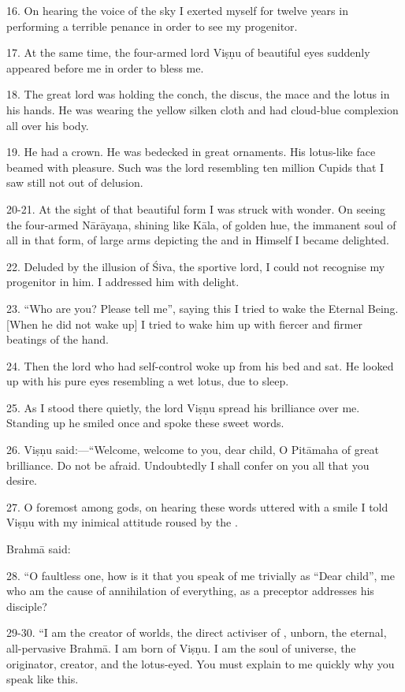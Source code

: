 16. On hearing the voice of the sky I exerted myself for twelve years in
performing a terrible penance in order to see my progenitor.

17. At the same time, the four-armed lord Viṣṇu of beautiful eyes suddenly
appeared before me in order to bless me.

18. The great lord was holding the conch, the discus, the mace and the lotus in
his hands. He was wearing the yellow silken cloth and had cloud-blue complexion
all over his body.

19. He had a crown. He was bedecked in great ornaments. His lotus-like face
beamed with pleasure. Such was the lord resembling ten million Cupids that I saw
still not out of delusion.

20-21. At the sight of that beautiful form I was struck with wonder. On seeing
the four-armed Nārāyaṇa, shining like Kāla, of golden hue, the immanent soul of
all in that form, of large arms depicting the  and  in Himself
I became delighted.

22. Deluded by the illusion of Śiva, the sportive lord, I could not recognise my
progenitor in him. I addressed him with delight.

23. “Who are you? Please tell me”, saying this I tried to wake the Eternal Being.
[When he did not wake up] I tried to wake him up with fiercer and firmer
beatings of the hand.

24. Then the lord who had self-control woke up from his bed and sat. He looked
up with his pure eyes resembling a wet lotus, due to sleep.

25. As I stood there quietly, the lord Viṣṇu spread his brilliance over me.
Standing up he smiled once and spoke these sweet words.

26. Viṣṇu said:—“Welcome, welcome to you, dear child, O Pitāmaha of great
brilliance. Do not be afraid. Undoubtedly I shall confer on you all that you
desire.

27. O foremost among gods, on hearing these words uttered with a smile I told
Viṣṇu with my inimical attitude roused by the .

Brahmā said:

28. “O faultless one, how is it that you speak of me trivially as “Dear child”,
me who am the cause of annihilation of everything, as a preceptor addresses his
disciple?

29-30. “I am the creator of worlds, the direct activiser of , unborn,
the eternal, all-pervasive Brahmā. I am born of Viṣṇu. I am the soul of universe,
the originator, creator, and the lotus-eyed. You must explain to me quickly why
you speak like this.

